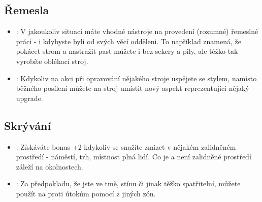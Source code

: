 \subsection{Řemesla}
\label{sec:trik-remesla}
\begin{itemize}
  
\item{}:
\label{sec:remesla-pripraven}
V jakoukoliv situaci máte vhodné nástroje na provedení (rozumné) řemeslné práci - i kdybyste byli od svých věcí odděleni. To například znamená, že pokácet strom a nastražit past můžete i bez sekery a pily, ale těžko tak vyrobíte obléhací stroj.

\item{}:
\label{sec:remesla-lepsi}
Kdykoliv na akci  při opravování nějakého stroje uspějete se stylem, namísto běžného posílení můžete na stroj umístit nový aspekt reprezentující nějaký upgrade.
\end{itemize}

\subsection{Skrývání}
\label{sec:trik-skryvani}
\begin{itemize}
  
\item{}:
\label{sec:skryvani-tvar}
Získáváte bonus +2 kdykoliv se snažíte zmizet v nějakém zalidněném prostředí - náměstí, trh, místnost plná lidí. Co je a není zalidněné prostředí záleží na okolnostech.

\item{}:
\label{sec:skryvani-nejasny}
Za předpokladu, že jste ve tmě, stínu či jinak těžko spatřitelní, můžete použít  na  proti útokům pomocí  z jiných zón.
\end{itemize}

